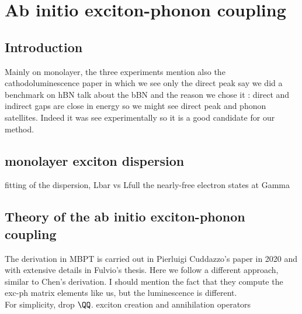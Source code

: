 \chapter{Ab initio exciton-phonon coupling}
\chaptertoc{}

\section{Introduction}
Mainly on monolayer, the three experiments
mention also the cathodoluminescence paper in which we see only the direct peak
say we did a benchmark on hBN
talk about the bBN and the reason we chose it : direct and indirect gaps are close in energy so we might see direct peak and phonon satellites. Indeed it was see experimentally so it is a good candidate for our method.

\section{monolayer exciton dispersion}
fitting of the dispersion, Lbar vs Lfull
the nearly-free electron states at Gamma

\section{Theory of the ab initio exciton-phonon coupling}
The derivation in MBPT is carried out in Pierluigi Cuddazzo's paper in 2020 and with extensive details in Fulvio's thesis. Here we follow a different approach, similar to Chen's derivation. I should mention the fact that they compute the exc-ph matrix elements like us, but the luminescence is different.\\
For simplicity, drop $\QQ$.
exciton creation and annihilation operators\\

